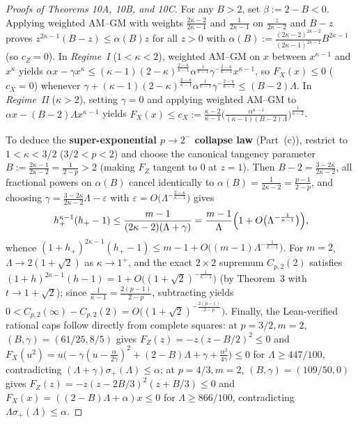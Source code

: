 \documentclass[10pt,letterpaper]{article}
\begin{document}
\begin{proof}[Proofs of Theorems 10A, 10B, and 10C]
For any $B > 2$, set $\beta := 2 - B < 0$. Applying weighted AM--GM with weights $\frac{2\kappa-2}{2\kappa-1}$ and $\frac{1}{2\kappa-1}$ on $\frac{z}{2\kappa-2}$ and $B - z$ proves $z^{2\kappa-1}(B - z) \le \alpha(B) z$ for all $z > 0$ with $\alpha(B) := \frac{(2\kappa-2)^{2\kappa-2}}{(2\kappa-1)^{2\kappa-1}} B^{2\kappa-1}$ (so $c_Z = 0$). In \emph{Regime~I} ($1 < \kappa < 2$), weighted AM--GM on $x$ between $x^{\kappa-1}$ and $x^\kappa$ yields $\alpha x - \gamma x^\kappa \le (\kappa-1)(2-\kappa)^{\frac{2-\kappa}{\kappa-1}}\alpha^{\frac{1}{\kappa-1}}\gamma^{-\frac{2-\kappa}{\kappa-1}} x^{\kappa-1}$, so $F_X(x) \le 0$ ($c_X = 0$) whenever $\gamma + (\kappa-1)(2-\kappa)^{\frac{2-\kappa}{\kappa-1}}\alpha^{\frac{1}{\kappa-1}}\gamma^{-\frac{2-\kappa}{\kappa-1}} \le (B - 2)\Lambda$. In \emph{Regime~II} ($\kappa > 2$), setting $\gamma = 0$ and applying weighted AM--GM to $\alpha x - (B-2)\Lambda x^{\kappa-1}$ yields $F_X(x) \le c_X := \frac{\kappa-2}{\kappa-1}\bigl(\frac{\alpha^{\kappa-1}}{(\kappa-1)(B-2)\Lambda}\bigr)^{\frac{1}{\kappa-2}}$.

To deduce the \textbf{super-exponential $p \to 2^-$ collapse law} (Part~(c)), restrict to $1 < \kappa < 3/2$ ($3/2 < p < 2$) and choose the canonical tangency parameter $B := \frac{2\kappa-1}{2\kappa-2} = \frac{1}{2-p} > 2$ (making $F_Z$ tangent to $0$ at $z = 1$). Then $B - 2 = \frac{3 - 2\kappa}{2\kappa - 2}$, all fractional powers on $\alpha(B)$ cancel identically to $\alpha(B) = \frac{1}{2\kappa - 2} = \frac{p-1}{2-p}$, and choosing $\gamma = \frac{3 - 2\kappa}{2\kappa - 2}\Lambda - \varepsilon$ with $\varepsilon = O\bigl(\Lambda^{-\frac{2-\kappa}{\kappa-1}}\bigr)$ gives
\[
  h_+^{\kappa - 1}(h_+ - 1)
  \le \frac{m - 1}{(2\kappa - 2)(\Lambda + \gamma)}
  = \frac{m - 1}{\Lambda}\Bigl(1 + O\bigl(\Lambda^{-\frac{1}{\kappa-1}}\bigr)\Bigr),
\]
whence $(1 + h_+)^{2\kappa-1}(h_+ - 1) \le m - 1 + O\bigl((m-1)\Lambda^{-\frac{1}{\kappa-1}}\bigr)$. For $m = 2$, $\Lambda \to 2(1+\sqrt{2})$ as $\kappa \to 1^+$, and the exact $2\times 2$ supremum $C_{p,2}(2)$ satisfies $(1+h)^{2\kappa-1}(h-1) = 1 + O\bigl((1+\sqrt{2})^{-\frac{1}{\kappa-1}}\bigr)$ (by Theorem~3 with $t \to 1+\sqrt{2}$); since $\frac{1}{\kappa - 1} = \frac{2(p-1)}{2-p}$, subtracting yields $0 < C_{p,2}(\infty) - C_{p,2}(2) = O\bigl((1+\sqrt{2})^{-\frac{2(p-1)}{2-p}}\bigr)$. Finally, the Lean-verified rational caps follow directly from complete squares: at $p = 3/2, m = 2$, $(B, \gamma) = (61/25, 8/5)$ gives $F_Z(z) = -z(z - B/2)^2 \le 0$ and $F_X(u^2) = u\bigl(-\gamma(u - \frac{\alpha}{2\gamma})^2 + (2-B)\Lambda + \gamma + \frac{\alpha^2}{4\gamma}\bigr) \le 0$ for $\Lambda \ge 447/100$, contradicting $(\Lambda + \gamma)\sigma_+(\Lambda) \le \alpha$; at $p = 4/3, m = 2$, $(B, \gamma) = (109/50, 0)$ gives $F_Z(z) = -z(z - 2B/3)^2(z + B/3) \le 0$ and $F_X(x) = ((2-B)\Lambda + \alpha)x \le 0$ for $\Lambda \ge 866/100$, contradicting $\Lambda\sigma_+(\Lambda) \le \alpha$.


\end{proof}
\end{document}
